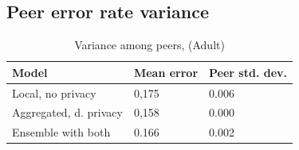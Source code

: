 \subsection{Peer error rate variance}
\label{sec:results_peer_error_variance}
\begin{table}[H]
	\centering

	\begin{tabular}{|l|l|l|}
		\textbf{Model}                  & \textbf{Mean error} & \textbf{Peer std. dev.} \\
		\hline
		Local, no privacy      & 0,175 & 0.006 \\
		Aggregated, d. privacy & 0,158 & 0.000	 \\
		Ensemble with both & 0.166 & 0.002 \\
	\end{tabular}
	\caption{Variance among peers, (Adult)}
	\label{table:peer_variance_adult}
\end{table}      

